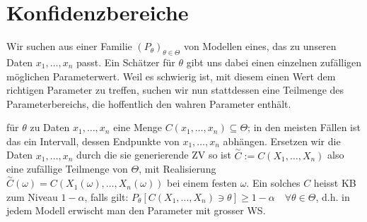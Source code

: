 
\section{Konfidenzbereiche}
Wir suchen aus einer Familie $(P_\theta)_{\theta \in \Theta}$ von Modellen eines, das zu unseren Daten $x_1, \dots, x_n$ passt. Ein Schätzer für $\theta$ gibt uns dabei einen einzelnen zufälligen möglichen Parameterwert. Weil es schwierig ist, mit diesem einen Wert dem richtigen Parameter zu treffen, suchen wir nun stattdessen eine Teilmenge des Parameterbereichs, die hoffentlich den wahren Parameter enthält.
\begin{itemize}
     für $\theta$ zu Daten $x_1, \dots, x_n$ eine Menge $C(x_1, \dots, x_n) \subseteq \Theta$; in den meisten Fällen ist das ein Intervall, dessen Endpunkte von $x_1, \dots, x_n$ abhängen. Ersetzen wir die Daten $x_1, \dots, x_n$ durch die sie generierende ZV so ist $\overset{\sim}{C} := C(X_1, \dots, X_n)$ also eine zufällige Teilmenge von $\Theta$, mit Realisierung $\overset{\sim}{C}(\omega) = C(X_1(\omega), \dots, X_n(\omega))$ bei einem festen $\omega$. Ein solches $C$ heisst KB zum Niveau $1 - \alpha$, falls gilt: $P_\theta[C(X_1, \dots, X_n) \ni \theta] \ge 1 - \alpha \quad \forall \theta \in \Theta$, d.h. in jedem Modell erwischt man den Parameter mit grosser WS.
\end{itemize}

